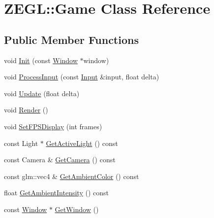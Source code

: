 \hypertarget{class_z_e_g_l_1_1_game}{}\section{Z\+E\+G\+L\+:\+:Game Class Reference}
\label{class_z_e_g_l_1_1_game}
\subsection*{Public Member Functions}
\begin{DoxyCompactItemize}
\item 
void \hyperlink{class_z_e_g_l_1_1_game_a08afc15e9896fef7f294f90d736d24cd}{Init} (const \hyperlink{class_z_e_g_l_1_1_window}{Window} $\ast$window)
\item 
void \hyperlink{class_z_e_g_l_1_1_game_ab64891eae2c4eb4f3bf7d161c6d5e37a}{Process\+Input} (const \hyperlink{class_z_e_g_l_1_1_input}{Input} \&input, float delta)
\item 
void \hyperlink{class_z_e_g_l_1_1_game_a6ad207394e4ce91f909d49c87802da08}{Update} (float delta)
\item 
void \hyperlink{class_z_e_g_l_1_1_game_a0897730fc9fed789f6c0f11d21a0c14a}{Render} ()
\item 
void \hyperlink{class_z_e_g_l_1_1_game_a38773e42c90201c4d8ca079ce54c4402}{Set\+F\+P\+S\+Display} (int frames)
\item 
const Light $\ast$ \hyperlink{class_z_e_g_l_1_1_game_a82f5be49774c3ad1a96daac71eb0ddec}{Get\+Active\+Light} () const 
\item 
const Camera \& \hyperlink{class_z_e_g_l_1_1_game_a65c6ec575fef37dd386fa0534f6cad86}{Get\+Camera} () const 
\item 
const glm\+::vec4 \& \hyperlink{class_z_e_g_l_1_1_game_a82963ff86de3c1a1969f32de12c3863e}{Get\+Ambient\+Color} () const 
\item 
float \hyperlink{class_z_e_g_l_1_1_game_adb8a60aa109a04a92c3aee2065f79702}{Get\+Ambient\+Intensity} () const 
\item 
const \hyperlink{class_z_e_g_l_1_1_window}{Window} $\ast$ \hyperlink{class_z_e_g_l_1_1_game_a12474b22720b2559db897cd83b7dffce}{Get\+Window} ()
\end{DoxyCompactItemize}

